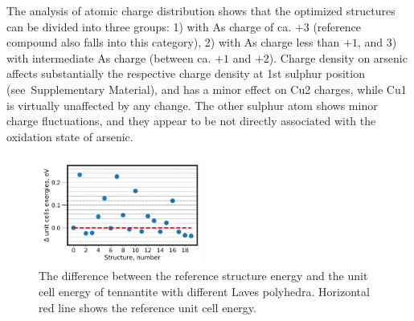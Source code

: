 \documentclass[preprint,review,12pt]{elsarticle}
\begin{document}
\begin{table}
\caption{\label{tab:energy}%
The difference between the reference structure energy, and the unit cell energy of tennantite with different Laves polyhedra.
}
\centering
{}
\end{table}

The analysis  of atomic charge distribution shows that the optimized structures can be divided into three groups: 1) with As charge of ca. $+3$ (reference compound also falls into this category), 2) with As charge less than $+1$, and 3) with intermediate As charge (between ca. $+1$ and $+2$).
Charge density on arsenic affects substantially the respective charge density at 1st sulphur position (see~Supplementary Material), and has a minor effect on Cu2 charges, while Cu1 is virtually unaffected by any change.
The other sulphur atom shows minor charge fluctuations, and they appear to be not directly associated with the oxidation state of arsenic.

\begin{figure}
\centering
 \includegraphics[width=0.48\textwidth]{energy_structure_rescale_ri}
 \caption{\label{fig:energy_structure_rescale} The difference between the reference structure energy and the unit cell energy of tennantite with different Laves polyhedra. Horizontal red line shows the reference unit cell energy. }
\end{figure}
\end{document}
